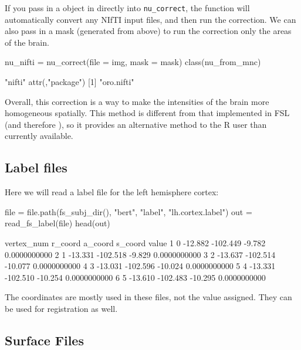 If you pass in a  object in directly into
\texttt{nu\_correct}, the function will automatically convert any NIfTI
input files, and then run the correction. We can also pass in a mask
(generated from above) to run the correction only the areas of the
brain.

\begin{Schunk}
\begin{Sinput}
nu_nifti = nu_correct(file = img, mask = mask)
class(nu_from_mnc)
\end{Sinput}
\begin{Soutput}
[1] "nifti"
attr(,"package")
[1] "oro.nifti"
\end{Soutput}
\end{Schunk}

Overall, this correction is a way to make the intensities of the brain
more homogeneous spatially. This method is different from that
implemented in FSL (and therefore ), so it provides an
alternative method to the R user than currently available.

\subsection{Label files}\label{label-files}

Here we will read a label file for the left hemisphere cortex:

\begin{Schunk}
\begin{Sinput}
file = file.path(fs_subj_dir(), "bert", "label", "lh.cortex.label")
out = read_fs_label(file)
head(out)
\end{Sinput}
\begin{Soutput}
  vertex_num r_coord  a_coord s_coord        value
1          0 -12.882 -102.449  -9.782 0.0000000000
2          1 -13.331 -102.518  -9.829 0.0000000000
3          2 -13.637 -102.514 -10.077 0.0000000000
4          3 -13.031 -102.596 -10.024 0.0000000000
5          4 -13.331 -102.510 -10.254 0.0000000000
6          5 -13.610 -102.483 -10.295 0.0000000000
\end{Soutput}
\end{Schunk}

The coordinates are mostly used in these files, not the value assigned.
They can be used for registration as well.

\subsection{Surface Files}\label{surface-files}

